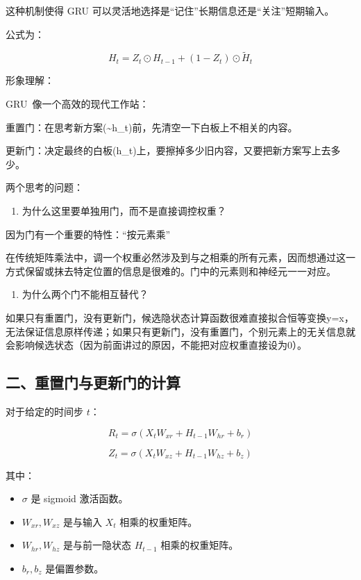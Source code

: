 这种机制使得 GRU 可以灵活地选择是``记住''长期信息还是``关注''短期输入。

公式为：

\[
H_t = Z_t \odot H_{t-1} + (1 - Z_t) \odot \tilde{H}_t
\]

形象理解：

GRU~像一个高效的现代工作站：

重置门：在思考新方案(\textasciitilde h\_t)前，先清空一下白板上不相关的内容。

更新门：决定最终的白板(h\_t)上，要擦掉多少旧内容，又要把新方案写上去多少。

两个思考的问题：

\begin{enumerate}
\def\labelenumi{\arabic{enumi}.}
\tightlist
\item
  为什么这里要单独用门，而不是直接调控权重？
\end{enumerate}

因为门有一个重要的特性：``按元素乘''

在传统矩阵乘法中，调一个权重必然涉及到与之相乘的所有元素，因而想通过这一方式保留或抹去特定位置的信息是很难的。门中的元素则和神经元一一对应。

\begin{enumerate}
\def\labelenumi{\arabic{enumi}.}
\setcounter{enumi}{1}
\tightlist
\item
  为什么两个门不能相互替代？
\end{enumerate}

如果只有重置门，没有更新门，候选隐状态计算函数很难直接拟合恒等变换y=x，无法保证信息原样传递；如果只有更新门，没有重置门，个别元素上的无关信息就会影响候选状态（因为前面讲过的原因，不能把对应权重直接设为0）。

\hypertarget{ux4e8cux91cdux7f6eux95e8ux4e0eux66f4ux65b0ux95e8ux7684ux8ba1ux7b97}{%
\subsection{二、重置门与更新门的计算}\label{ux4e8cux91cdux7f6eux95e8ux4e0eux66f4ux65b0ux95e8ux7684ux8ba1ux7b97}}

对于给定的时间步 \(t\)：

\[
R_t = \sigma(X_t W_{xr} + H_{t-1}W_{hr} + b_r)
\]

\[
Z_t = \sigma(X_t W_{xz} + H_{t-1}W_{hz} + b_z)
\]

其中：

\begin{itemize}
\tightlist
\item
  \(\sigma\) 是 sigmoid 激活函数。
\item
  \(W_{xr}, W_{xz}\) 是与输入 \(X_t\) 相乘的权重矩阵。
\item
  \(W_{hr}, W_{hz}\) 是与前一隐状态 \(H_{t-1}\) 相乘的权重矩阵。
\item
  \(b_r, b_z\) 是偏置参数。
\end{itemize}

